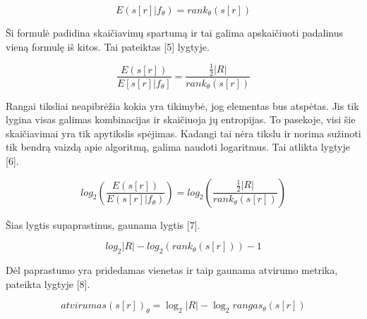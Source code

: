 \documentclass{VUMIFInfBakalaurinis}
\begin{document}
\begin{equation}
E(s[r]|f_{\theta}) = rank_{\theta}(s[r])
\end{equation} 

\par Ši formulė padidina skaičiavimų spartumą ir tai galima apskaičiuoti padalinus vieną formulę iš kitos. Tai pateiktas [5] lygtyje.

\begin{equation}
\frac{E(s[r])}{E[s[r]|f_{\theta}]} = \frac{\frac{1}{2}|R|}{rank_{\theta}(s[r])}
\end{equation}

\par Rangai tiksliai neapibrėžia kokia yra tikimybė, jog elementas bus atspėtas. Jis tik lygina visas galimas kombinacijas ir skaičiuoja jų entropijas. To pasekoje, visi šie skaičiavimai yra tik apytikslis spėjimas. Kadangi tai nėra tikslu ir norima sužinoti tik bendrą vaizdą apie algoritmą, galima naudoti logaritmus. Tai atlikta lygtyje [6].

\begin{equation}
log_{2}(\frac{E(s[r])}{E(s[r]|f_{\theta})}) = log_{2}(\frac{\frac{1}{2}|R|}{rank_{\theta}(s[r])})
\end{equation}

\par Šias lygtis supaprastinus, gaunama lygtis [7].

\begin{equation}
log_{2}|R| - log_{2}(rank_{\theta}(s[r])) - 1
\end{equation}

\par Dėl paprastumo yra pridedamas vienetas ir taip gaunama atvirumo metrika, pateikta lygtyje [8].

\begin{equation}
atvirumas(s[r])_{\theta} = \log_2 | R | - \log_2 rangas_{\theta}(s[r])
\end{equation}
\end{document}
